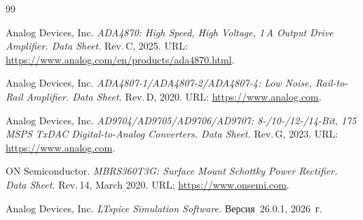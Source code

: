 \documentclass[a4paper, 12pt]{article}
\begin{document}
\begin{thebibliography}{99}

Analog Devices, Inc. \textit{ADA4870: High Speed, High Voltage,
1\,A Output Drive Amplifier. Data Sheet.} Rev.\,C, 2025.
URL: \url{https://www.analog.com/en/products/ada4870.html}.

Analog Devices, Inc. \textit{ADA4807-1/ADA4807-2/ADA4807-4:
Low Noise, Rail-to-Rail Amplifier. Data Sheet.} Rev.\,D, 2020.
URL: \url{https://www.analog.com}.

Analog Devices, Inc. \textit{AD9704/AD9705/AD9706/AD9707:
8-/10-/12-/14-Bit, 175\,MSPS TxDAC Digital-to-Analog Converters.
Data Sheet.} Rev.\,G, 2023.
URL: \url{https://www.analog.com}.

ON Semiconductor. \textit{MBRS360T3G: Surface Mount Schottky Power
Rectifier. Data Sheet.} Rev.\,14, March 2020.
URL: \url{https://www.onsemi.com}.

Analog Devices, Inc. \textit{LTspice Simulation Software.}
Версия~26.0.1, 2026~г.

\end{thebibliography}
\end{document}
